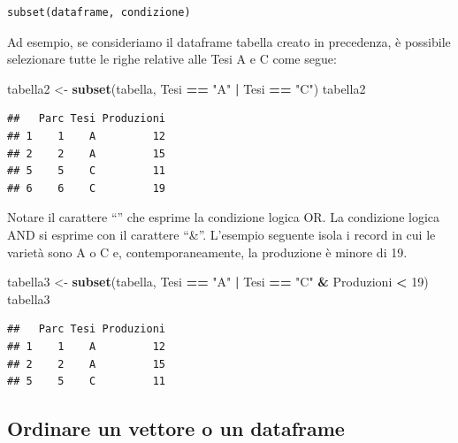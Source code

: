 \documentclass[a4paper,12pt,oneside]{book}
\newenvironment{Shaded}{\begin{snugshade}}{\end{snugshade}}
\newcommand{\KeywordTok}[1]{\textcolor[rgb]{0.13,0.29,0.53}{\textbf{#1}}}
\newcommand{\DecValTok}[1]{\textcolor[rgb]{0.00,0.00,0.81}{#1}}
\newcommand{\StringTok}[1]{\textcolor[rgb]{0.31,0.60,0.02}{#1}}
\newcommand{\OperatorTok}[1]{\textcolor[rgb]{0.81,0.36,0.00}{\textbf{#1}}}
\newcommand{\NormalTok}[1]{#1}
\begin{document}
\begin{verbatim}
subset(dataframe, condizione)
\end{verbatim}

Ad esempio, se consideriamo il dataframe tabella creato in precedenza, è
possibile selezionare tutte le righe relative alle Tesi A e C come
segue:

\begin{Shaded}
\begin{Highlighting}[]
\NormalTok{tabella2  <-}\StringTok{  }\KeywordTok{subset}\NormalTok{(tabella, Tesi }\OperatorTok{==}\StringTok{ "A"} \OperatorTok{|}\StringTok{ }\NormalTok{Tesi }\OperatorTok{==}\StringTok{ "C"}\NormalTok{)}
\NormalTok{tabella2}
\end{Highlighting}
\end{Shaded}

\begin{verbatim}
##   Parc Tesi Produzioni
## 1    1    A         12
## 2    2    A         15
## 5    5    C         11
## 6    6    C         19
\end{verbatim}

Notare il carattere ``\textbar{}'' che esprime la condizione logica OR.
La condizione logica AND si esprime con il carattere ``\&''. L'esempio
seguente isola i record in cui le varietà sono A o C e,
contemporaneamente, la produzione è minore di 19.

\begin{Shaded}
\begin{Highlighting}[]
\NormalTok{tabella3  <-}\StringTok{  }\KeywordTok{subset}\NormalTok{(tabella, Tesi }\OperatorTok{==}\StringTok{ "A"} \OperatorTok{|}\StringTok{ }\NormalTok{Tesi }\OperatorTok{==}\StringTok{ "C"} \OperatorTok{&}\StringTok{ }
\StringTok{                       }\NormalTok{Produzioni }\OperatorTok{<}\StringTok{ }\DecValTok{19}\NormalTok{)}
\NormalTok{tabella3}
\end{Highlighting}
\end{Shaded}

\begin{verbatim}
##   Parc Tesi Produzioni
## 1    1    A         12
## 2    2    A         15
## 5    5    C         11
\end{verbatim}

\subsection{Ordinare un vettore o un
dataframe}\label{ordinare-un-vettore-o-un-dataframe}
\end{document}
